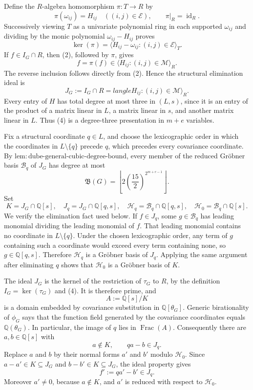 Define the \(R\)-algebra homomorphism \(\pi:T\to R\) by
\[
 \pi(\omega_{ij})=H_{ij}\quad ((i,j)\in\mathcal E),
 \qquad
 \pi|_R=\operatorname{id}_R.
\]
Successively viewing \(T\) as a univariate polynomial ring in each supported \(\omega_{ij}\) and dividing by the monic polynomial \(\omega_{ij}-H_{ij}\) proves
\[
 \ker(\pi)=\langle H_{ij}-\omega_{ij}:(i,j)\in\mathcal E\rangle_T.
 \tag{3}
\]
If \(f\in I_G\cap R\), then (2), followed by \(\pi\), gives
\[
 f=\pi(f)\in\langle H_{ij}:(i,j)\in\mathcal M\rangle_R.
\]
The reverse inclusion follows directly from (2).  Hence the structural elimination ideal is
\[
 J_G:=I_G\cap R=langle H_{ij}:(i,j)\in\mathcal M\rangle_R.
 \tag{4}
\]
Every entry of \(H\) has total degree at most three in \((L,s)\), since it is an entry of the product of a matrix linear in \(L\), a matrix linear in \(s\), and another matrix linear in \(L\).  Thus (4) is a degree-three presentation in \(m+e\) variables.

Fix a structural coordinate \(q\in L\), and choose the lexicographic order in which the coordinates in \(L\setminus\{q\}\) precede \(q\), which precedes every covariance coordinate.  By \(\mathrm{lem:dube\mbox{-}general\mbox{-}cubic\mbox{-}degree\mbox{-}bound}\), every member of the reduced Gr\"obner basis \(\mathcal B_q\) of \(J_G\) has degree at most
\[
 \mathfrak B(G)=
 \left\lfloor2\left(\frac{15}{2}\right)^{2^{m+e-1}}\right\rfloor.
 \tag{5}
\]
Set
\[
 K=J_G\cap\mathbb Q[s],
 \quad
 J_q=J_G\cap\mathbb Q[q,s],
 \quad
 \mathcal H_q=\mathcal B_q\cap\mathbb Q[q,s],
 \quad
 \mathcal H_0=\mathcal B_q\cap\mathbb Q[s].
 \tag{6}
\]
We verify the elimination fact used below.  If \(f\in J_q\), some \(g\in\mathcal B_q\) has leading monomial dividing the leading monomial of \(f\).  That leading monomial contains no coordinate in \(L\setminus\{q\}\).  Under the chosen lexicographic order, any term of \(g\) containing such a coordinate would exceed every term containing none, so \(g\in\mathbb Q[q,s]\).  Therefore \(\mathcal H_q\) is a Gr\"obner basis of \(J_q\).  Applying the same argument after eliminating \(q\) shows that \(\mathcal H_0\) is a Gr\"obner basis of \(K\).

The ideal \(J_G\) is the kernel of the restriction of \(\tau_G\) to \(R\), by the definition \(I_G=\ker(\tau_G)\) and (4).  It is therefore prime, and
\[
 A:=\mathbb Q[s]/K
\]
is a domain embedded by covariance substitution in \(\mathbb Q[\theta_G]\).  Generic birationality of \(\phi_G\) says that the function field generated by the covariance coordinates equals \(\mathbb Q(\theta_G)\).  In particular, the image of \(q\) lies in \(\operatorname{Frac}(A)\).  Consequently there are \(a,b\in\mathbb Q[s]\) with
\[
 a\notin K,
 \qquad
 qa-b\in J_q.
 \tag{7}
\]
Replace \(a\) and \(b\) by their normal forms \(a'\) and \(b'\) modulo \(\mathcal H_0\).  Since \(a-a'\in K\subseteq J_G\) and \(b-b'\in K\subseteq J_G\), the ideal property gives
\[
 f':=qa'-b'\in J_q.
 \tag{8}
\]
Moreover \(a'\neq0\), because \(a\notin K\), and \(a'\) is reduced with respect to \(\mathcal H_0\).

